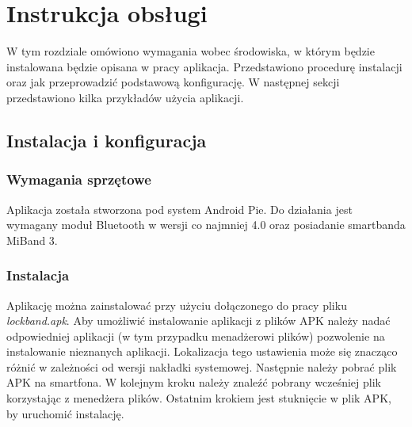 \chapter{Instrukcja obsługi}
\thispagestyle{chapterBeginStyle}
\label{rozdzial4}

W tym rozdziale omówiono wymagania wobec środowiska, w którym będzie instalowana będzie opisana w pracy aplikacja. Przedstawiono procedurę instalacji oraz jak przeprowadzić podstawową konfigurację. W następnej sekcji przedstawiono kilka przykładów użycia aplikacji.

\section{Instalacja i konfiguracja}
\subsection{Wymagania sprzętowe}
Aplikacja została stworzona pod system Android Pie. Do działania jest wymagany moduł Bluetooth w wersji co najmniej 4.0 oraz posiadanie smartbanda MiBand 3.
\subsection{Instalacja}
Aplikację można zainstalować przy użyciu dołączonego do pracy pliku \textit{lockband.apk}. Aby umożliwić instalowanie aplikacji z plików APK należy nadać odpowiedniej aplikacji (w tym przypadku menadżerowi plików) pozwolenie na instalowanie nieznanych aplikacji. Lokalizacja tego ustawienia może się znacząco różnić w zależności od wersji nakładki systemowej. Następnie należy pobrać plik APK na smartfona. W kolejnym kroku należy znaleźć pobrany wcześniej plik korzystając z menedżera plików. Ostatnim krokiem jest stuknięcie w plik APK, by uruchomić instalację.
